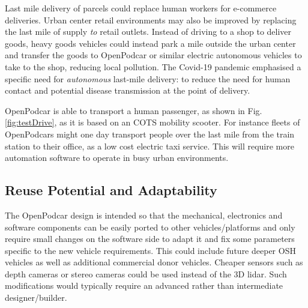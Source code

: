 \documentclass[a4paper]{article}
\begin{document}
	Last mile delivery of parcels could replace human workers for e-commerce deliveries. Urban center retail environments may also be improved by replacing the last mile of supply {\em to} retail outlets. Instead of driving to a shop to deliver goods, heavy goods vehicles could instead park a mile outside the urban center and transfer the goods to OpenPodcar or similar electric autonomous vehicles to take to the shop, reducing local pollution. The Covid-19 pandemic emphasised a specific need for {\em autonomous} last-mile delivery: to reduce the need for human contact and potential disease transmission at the point of delivery.
	
	OpenPodcar is able to transport a human passenger, as shown in Fig. \ref{fig:testDrive}, as it is based on an COTS mobility scooter.  For instance fleets of OpenPodcars might one day transport people over the last mile from the train station to their office, as a low cost electric taxi service. This will require more automation software to operate in busy urban environments.
	
	\subsection{Reuse Potential and Adaptability}\label{h.6wkumyl0ejrh}
	
	The OpenPodcar design is intended so that the mechanical, electronics and software components can be easily ported to other vehicles/platforms and only require small changes on the software side to adapt it and fix some parameters specific to the new vehicle requirements. This could include future deeper OSH vehicles as well as additional commercial donor vehicles. Cheaper sensors such as depth cameras or stereo cameras could be used instead of the 3D lidar. Such modifications would typically require an advanced rather than intermediate designer/builder.
	
	
	
	
\end{document}
